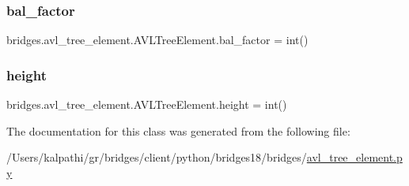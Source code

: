 \subsubsection{\texorpdfstring{bal\+\_\+factor}{bal\_factor}}
{\footnotesize\ttfamily bridges.\+avl\+\_\+tree\+\_\+element.\+A\+V\+L\+Tree\+Element.\+bal\+\_\+factor = int()\hspace{0.3cm}{\ttfamily [static]}}

\mbox{\label{classbridges_1_1avl__tree__element_1_1_a_v_l_tree_element_a83590431488989ab3143e69c5fc2deb3}} 
\subsubsection{\texorpdfstring{height}{height}}
{\footnotesize\ttfamily bridges.\+avl\+\_\+tree\+\_\+element.\+A\+V\+L\+Tree\+Element.\+height = int()\hspace{0.3cm}{\ttfamily [static]}}



The documentation for this class was generated from the following file\+:\begin{DoxyCompactItemize}
\item 
/\+Users/kalpathi/gr/bridges/client/python/bridges18/bridges/\mbox{\hyperlink{avl__tree__element_8py}{avl\+\_\+tree\+\_\+element.\+py}}\end{DoxyCompactItemize}
